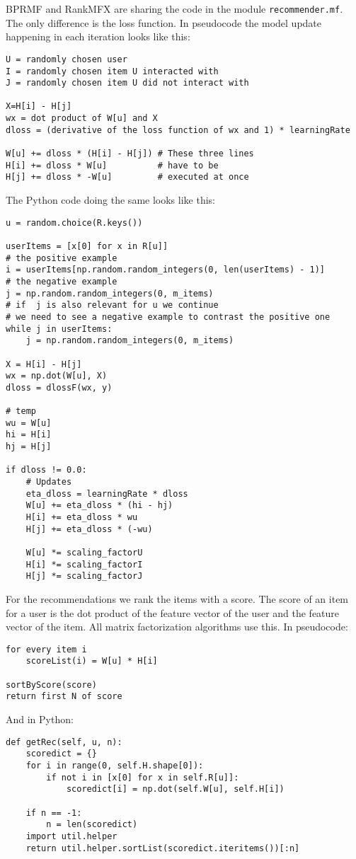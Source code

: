 BPRMF and RankMFX are sharing the code in the module \lstinline!recommender.mf!. 
The only difference is the loss function.
In pseudocode the model update happening in each iteration looks like this:
\begin{lstlisting}[style=pseudocode]
U = randomly chosen user
I = randomly chosen item U interacted with
J = randomly chosen item U did not interact with

X=H[i] - H[j]
wx = dot product of W[u] and X
dloss = (derivative of the loss function of wx and 1) * learningRate

W[u] += dloss * (H[i] - H[j]) # These three lines
H[i] += dloss * W[u]          # have to be
H[j] += dloss * -W[u]         # executed at once
\end{lstlisting}
The Python code doing the same looks like this:
\begin{lstlisting}[style=python]
u = random.choice(R.keys())

userItems = [x[0] for x in R[u]]
# the positive example
i = userItems[np.random.random_integers(0, len(userItems) - 1)]
# the negative example
j = np.random.random_integers(0, m_items)
# if  j is also relevant for u we continue
# we need to see a negative example to contrast the positive one
while j in userItems:
    j = np.random.random_integers(0, m_items)

X = H[i] - H[j]
wx = np.dot(W[u], X)
dloss = dlossF(wx, y)

# temp
wu = W[u]
hi = H[i]
hj = H[j]

if dloss != 0.0:
    # Updates
    eta_dloss = learningRate * dloss
    W[u] += eta_dloss * (hi - hj)
    H[i] += eta_dloss * wu
    H[j] += eta_dloss * (-wu)

    W[u] *= scaling_factorU
    H[i] *= scaling_factorI
    H[j] *= scaling_factorJ
\end{lstlisting}
For the recommendations we rank the items with a score.
The score of an item for a user is the dot
product of the feature vector of the user 
and the feature vector of the item. All matrix factorization
algorithms use this.
In pseudocode:
\begin{lstlisting}[style=pseudocode]
for every item i
    scoreList(i) = W[u] * H[i]

sortByScore(score)
return first N of score
\end{lstlisting}
And in Python:
\begin{lstlisting}[style=python]
def getRec(self, u, n):
    scoredict = {}
    for i in range(0, self.H.shape[0]):
        if not i in [x[0] for x in self.R[u]]:
            scoredict[i] = np.dot(self.W[u], self.H[i])

    if n == -1:
        n = len(scoredict)
    import util.helper
    return util.helper.sortList(scoredict.iteritems())[:n]
\end{lstlisting}


